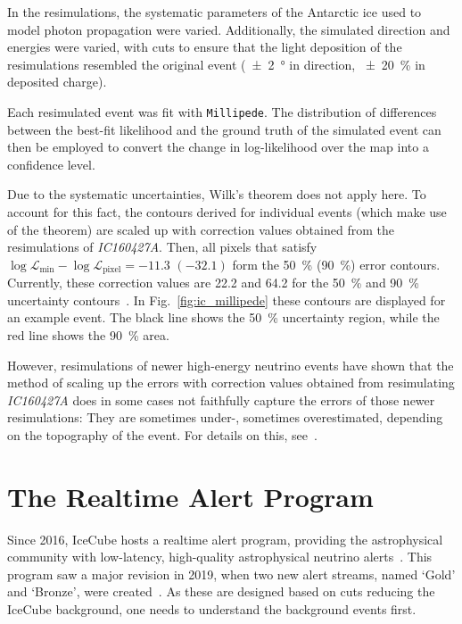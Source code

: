 In the resimulations, the systematic parameters of the Antarctic ice used to model photon propagation were varied. Additionally, the simulated direction and energies were varied, with cuts to ensure that the light deposition of the resimulations resembled the original event (\SI{\pm2}{\degree} in direction, \SI{\pm20}{\percent} in deposited charge).

Each resimulated event was fit with \texttt{Millipede}. The distribution of differences between the best-fit likelihood and the ground truth of the simulated event can then be employed to convert the change in log-likelihood over the map into a confidence level.

Due to the systematic uncertainties, Wilk's theorem does not apply here. To account for this fact, the contours derived for individual events (which make use of the theorem) are scaled up with correction values obtained from the resimulations of \emph{IC160427A}. Then, all pixels that satisfy $\log \mathcal{L}_\text{min}-\log \mathcal{L}_\text{pixel} = -11.3$ $(-32.1)$ form the \SI{50}{\percent} (\SI{90}{\percent}) error contours. Currently, these correction values are 22.2 and 64.2 for the \SI{50}{\percent} and \SI{90}{\percent} uncertainty contours~. In Fig.~\ref{fig:ic_millipede} these contours are displayed for an example event. The black line shows the \SI{50}{\percent} uncertainty region, while the red line shows the \SI{90}{\percent} area.

However, resimulations of newer high-energy neutrino events have shown that the method of scaling up the errors with correction values obtained from resimulating \emph{IC160427A} does in some cases not faithfully capture the errors of those newer resimulations: They are sometimes under-, sometimes overestimated, depending on the topography of the event. For details on this, see~\cite{Gualda2021}.

\section{The Realtime Alert Program}\label{ic_alert_program}
Since 2016, IceCube hosts a realtime alert program, providing the astrophysical community with low-latency, high-quality astrophysical neutrino alerts~\cite{Aartsen2017a}. This program saw a major revision in 2019, when two new alert streams, named `Gold' and `Bronze', were created~. As these are designed based on cuts reducing the IceCube background, one needs to understand the background events first.

